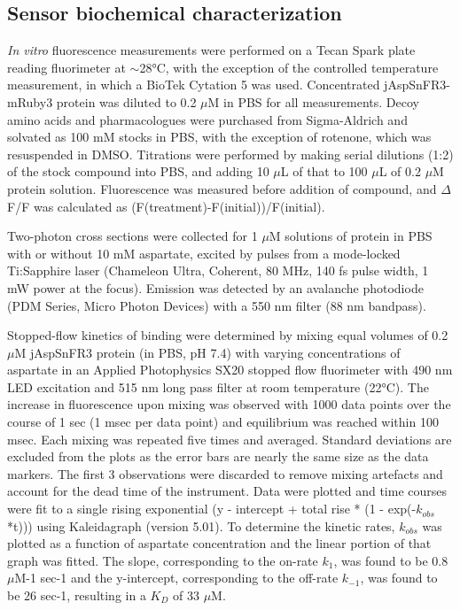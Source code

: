 \subsection{Sensor biochemical characterization}
\textit{In vitro} fluorescence measurements were performed on a Tecan Spark plate reading fluorimeter at $\sim$28°C, with the exception of the controlled temperature measurement, in which a BioTek Cytation 5 was used.
Concentrated jAspSnFR3-mRuby3 protein was diluted to 0.2 $\mu$M in PBS for all measurements.
Decoy amino acids and pharmacologues were purchased from Sigma-Aldrich and solvated as 100 mM stocks in PBS, with the exception of rotenone, which was resuspended in DMSO.
Titrations were performed by making serial dilutions (1:2) of the stock compound into PBS, and adding 10 $\mu$L of that to 100 $\mu$L of 0.2 $\mu$M protein solution.
Fluorescence was measured before addition of compound, and $\Delta$F/F was calculated as (F(treatment)-F(initial))/F(initial).

Two-photon cross sections were collected for 1 $\mu$M solutions of protein in PBS with or without 10 mM aspartate, excited by pulses from a mode-locked Ti:Sapphire laser (Chameleon Ultra, Coherent, 80 MHz, 140 fs pulse width, 1 mW power at the focus).
Emission was detected by an avalanche photodiode (PDM Series, Micro Photon Devices) with a 550 nm filter (88 nm bandpass).

Stopped-flow kinetics of binding were determined by mixing equal volumes of 0.2 $\mu$M jAspSnFR3 protein (in PBS, pH 7.4) with varying concentrations of aspartate in an Applied Photophysics SX20 stopped flow fluorimeter with 490 nm LED excitation and 515 nm long pass filter at room temperature (22°C).
The increase in fluorescence upon mixing was observed with 1000 data points over the course of 1 sec (1 msec per data point) and equilibrium was reached within 100 msec.
Each mixing was repeated five times and averaged.
Standard deviations are excluded from the plots as the error bars are nearly the same size as the data markers.
The first 3 observations were discarded to remove mixing artefacts and account for the dead time of the instrument.
Data were plotted and time courses were fit to a single rising exponential (y - intercept + total rise * (1 - exp(-$k_{obs}$*t))) using Kaleidagraph (version 5.01).
To determine the kinetic rates, $k_{obs}$ was plotted as a function of aspartate concentration and the linear portion of that graph was fitted.
The slope, corresponding to the on-rate $k_1$, was found to be 0.8 $\mu$M-1 sec-1 and the y-intercept, corresponding to the off-rate $k_{-1}$, was found to be 26 sec-1, resulting in a $K_D$ of 33 $\mu$M.


